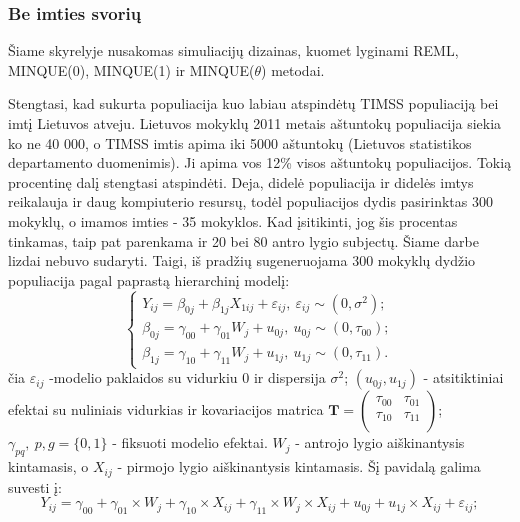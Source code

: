 \documentclass[12pt,a4paper]{article}
\begin{document}
\subsubsection{Be imties svorių}\label{subsubsec:besvoriu}
\indent Šiame skyrelyje nusakomas simuliacijų dizainas, kuomet lyginami REML, MINQUE(0), MINQUE(1) ir MINQUE($\theta$) metodai.

\indent Stengtasi, kad sukurta populiacija kuo labiau atspindėtų TIMSS populiaciją bei imtį Lietuvos atveju. Lietuvos mokyklų 2011 metais aštuntokų populiacija siekia ko ne 40 000, o TIMSS imtis apima iki 5000 aštuntokų (Lietuvos statistikos departamento duomenimis). Ji apima vos 12\% visos aštuntokų populiacijos. Tokią procentinę dalį stengtasi atspindėti. Deja, didelė populiacija ir didelės imtys reikalauja ir daug kompiuterio resursų, todėl populiacijos dydis pasirinktas 300 mokyklų, o imamos imties - 35 mokyklos. Kad įsitikinti, jog šis procentas tinkamas, taip pat parenkama ir 20 bei 80 antro lygio subjectų. Šiame darbe lizdai nebuvo sudaryti. Taigi, iš pradžių sugeneruojama 300 mokyklų dydžio populiacija pagal paprastą hierarchinį modelį:
\begin{equation}\label{eq:simul}
\left\{
\begin{array}{l}
Y_{ij}=\beta_{0j}+\beta_{1j}X_{1ij}+\varepsilon_{ij}, \ \varepsilon_{ij}\sim (0, \sigma^2);\\
\beta_{0j}=\gamma_{00}+\gamma_{01}W_j+u_{0j}, \ u_{0j}\sim (0, \tau_{00});\\
\beta_{1j}=\gamma_{10}+\gamma_{11}W_j+u_{1j}, \ u_{1j}\sim (0, \tau_{11}).
\end{array} \right.
\end{equation}
čia $\varepsilon_{ij}$ -modelio paklaidos su vidurkiu $0$ ir dispersija $\sigma^2$; $\left(u_{0j}, u_{1j}\right)$ - atsitiktiniai efektai su nuliniais vidurkias ir kovariacijos matrica $\mathbf{T}=\begin{pmatrix}
\tau_{00} & \tau_{01} \\
\tau_{10} & \tau_{11} \\
\end{pmatrix}$; $\gamma_{pq},\ p,g = \{0,1\}$ - fiksuoti modelio efektai. $W_j$ - antrojo lygio aiškinantysis kintamasis, o $X_{ij}$ - pirmojo lygio aiškinantysis kintamasis. Šį pavidalą galima suvesti į:
\begin{equation} \label{eq:deq}
Y_{ij} = \gamma_{00} +\gamma_{01}\times W_{j}+ \gamma_{10}\times X_{ij}+\gamma_{11}\times W_{j}\times X_{ij}+u_{0j}+u_{1j}\times X_{ij}+\varepsilon_{ij};
\end{equation}
\end{document}
